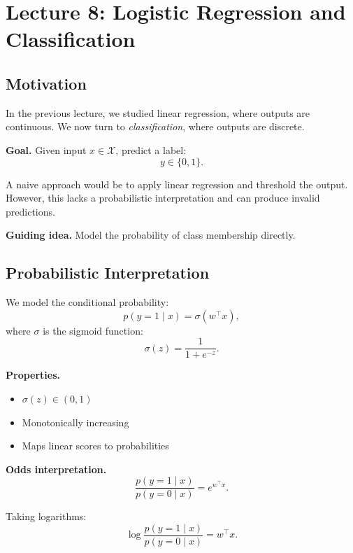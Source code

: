 \section{Lecture 8: Logistic Regression and Classification}

\subsection{Motivation}

In the previous lecture, we studied linear regression, where outputs are continuous. We now turn to \emph{classification}, where outputs are discrete.

\medskip

\noindent
\textbf{Goal.}  
Given input $x \in \mathcal{X}$, predict a label:
\[
y \in \{0,1\}.
\]

\medskip

\noindent
A naive approach would be to apply linear regression and threshold the output. However, this lacks a probabilistic interpretation and can produce invalid predictions.

\medskip

\noindent
\textbf{Guiding idea.}  
Model the probability of class membership directly.

\subsection{Probabilistic Interpretation}

We model the conditional probability:
\[
p(y = 1 \mid x) = \sigma(w^\top x),
\]
where $\sigma$ is the sigmoid function:
\[
\sigma(z) = \frac{1}{1 + e^{-z}}.
\]

\medskip

\noindent
\textbf{Properties.}
\begin{itemize}
    \item $\sigma(z) \in (0,1)$
    \item Monotonically increasing
    \item Maps linear scores to probabilities
\end{itemize}

\medskip

\noindent
\textbf{Odds interpretation.}
\[
\frac{p(y=1 \mid x)}{p(y=0 \mid x)} = e^{w^\top x}.
\]

\medskip

\noindent
Taking logarithms:
\[
\log \frac{p(y=1 \mid x)}{p(y=0 \mid x)} = w^\top x.
\]

\medskip

